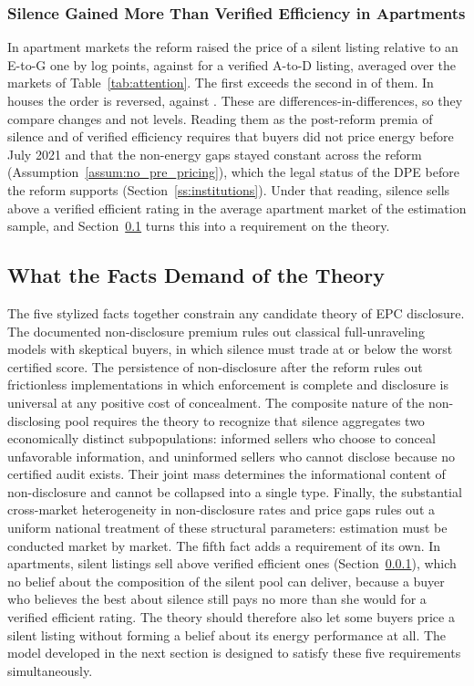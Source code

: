 \subsubsection{Silence Gained More Than Verified Efficiency in Apartments}
\label{ss:fact5}

In apartment markets the reform raised the price of a silent listing relative to an E-to-G one by \attDthreeApt{} log points, against \attBthreeApt{} for a verified A-to-D listing, averaged over the \attNMarketsApt{} markets of Table~\ref{tab:attention}. The first exceeds the second in \attNDgtBApt{} of them. In houses the order is reversed, \attDthreeHouse{} against \attBthreeHouse{}. These are differences-in-differences, so they compare changes and not levels. Reading them as the post-reform premia of silence and of verified efficiency requires that buyers did not price energy before July 2021 and that the non-energy gaps stayed constant across the reform (Assumption~\ref{assum:no_pre_pricing}), which the legal status of the DPE before the reform supports (Section~\ref{ss:institutions}). Under that reading, silence sells above a verified efficient rating in the average apartment market of the estimation sample, and Section~\ref{ss:facts_demand} turns this into a requirement on the theory.

\subsection{What the Facts Demand of the Theory}
\label{ss:facts_demand}

The five stylized facts together constrain any candidate theory of EPC disclosure. The documented non-disclosure premium rules out classical full-unraveling models with skeptical buyers, in which silence must trade at or below the worst certified score. The persistence of non-disclosure after the reform rules out frictionless implementations in which enforcement is complete and disclosure is universal at any positive cost of concealment. The composite nature of the non-disclosing pool requires the theory to recognize that silence aggregates two economically distinct subpopulations: informed sellers who choose to conceal unfavorable information, and uninformed sellers who cannot disclose because no certified audit exists. Their joint mass determines the informational content of non-disclosure and cannot be collapsed into a single type. Finally, the substantial cross-market heterogeneity in non-disclosure rates and price gaps rules out a uniform national treatment of these structural parameters: estimation must be conducted market by market. The fifth fact adds a requirement of its own. In apartments, silent listings sell above verified efficient ones (Section~\ref{ss:fact5}), which no belief about the composition of the silent pool can deliver, because a buyer who believes the best about silence still pays no more than she would for a verified efficient rating. The theory should therefore also let some buyers price a silent listing without forming a belief about its energy performance at all. The model developed in the next section is designed to satisfy these five requirements simultaneously.
